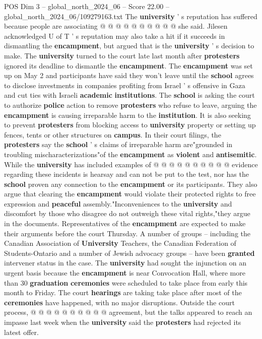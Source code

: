 \begin{textsample}{POS Dim 3 – global\_north\_2024\_06 – Score 22.00 – global\_north\_2024\_06/109279163.txt}
The \textbf{university} ' s reputation has suffered because people are associating @ @ @ @ @ @ @ @ @ @ she said.
Jilesen acknowledged U of T ' s reputation may also take a hit if it succeeds in dismantling the \textbf{encampment}, but argued that is the \textbf{university} ' s decision to make.
The \textbf{university} turned to the court late last month after \textbf{protesters} ignored its deadline to dismantle the \textbf{encampment}.
The \textbf{encampment} was set up on May 2 and participants have said they won't leave until the \textbf{school} agrees to disclose investments in companies profiting from Israel ' s offensive in Gaza and cut ties with Israeli \textbf{academic} \textbf{institutions}.
The \textbf{school} is asking the court to authorize \textbf{police} action to remove \textbf{protesters} who refuse to leave, arguing the \textbf{encampment} is causing irreparable harm to the \textbf{institution}.
It is also seeking to prevent \textbf{protesters} from blocking access to \textbf{university} property or setting up fences, tents or other structures on \textbf{campus}.
In their court filings, the \textbf{protesters} say the \textbf{school} ' s claims of irreparable harm are"grounded in troubling mischaracterizations"of the \textbf{encampment} as \textbf{violent} and \textbf{antisemitic}.
While the \textbf{university} has included examples of @ @ @ @ @ @ @ @ @ @ evidence regarding these incidents is hearsay and can not be put to the test, nor has the \textbf{school} proven any connection to the \textbf{encampment} or its participants.
They also argue that clearing the \textbf{encampment} would violate their protected rights to free expression and \textbf{peaceful} assembly."Inconveniences to the \textbf{university} and discomfort by those who disagree do not outweigh these vital rights,"they argue in the documents.
Representatives of the \textbf{encampment} are expected to make their arguments before the court Thursday.
A number of groups -- including the Canadian Association of \textbf{University} Teachers, the Canadian Federation of Students-Ontario and a number of Jewish advocacy groups -- have been \textbf{granted} intervener status in the case.
The \textbf{university} had sought the injunction on an urgent basis because the \textbf{encampment} is near Convocation Hall, where more than 30 \textbf{graduation} \textbf{ceremonies} were scheduled to take place from early this month to Friday.
The court \textbf{hearings} are taking take place after most of the \textbf{ceremonies} have happened, with no major disruptions.
Outside the court process, @ @ @ @ @ @ @ @ @ @ agreement, but the talks appeared to reach an impasse last week when the \textbf{university} said the \textbf{protesters} had rejected its latest offer.

\end{textsample}
